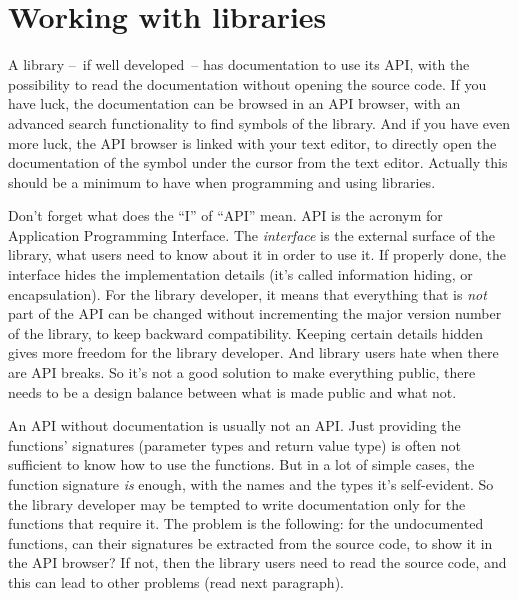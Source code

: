\documentclass[a4paper,11pt]{article}
\date{January 3, 2020}
\title{\documentTitle}
\author{\documentAuthor}
\begin{document}
\maketitle
\tableofcontents

\begin{abstract}
  This article tries to convince application developers to write API documentation. We first look at libraries, and what are the requisite ingredients to make the programmer's life easier (note, not all libraries or development platforms follow all those ingredients, so there is room for improvement in libraries as well). Then we look at applications, why an application usually lacks proper API documentation, and what problems it causes.
\end{abstract}


\section{Working with libraries}

A library --~if well developed~-- has documentation to use its API, with the possibility to read the documentation without opening the source code. If you have luck, the documentation can be browsed in an API browser, with an advanced search functionality to find symbols of the library. And if you have even more luck, the API browser is linked with your text editor, to directly open the documentation of the symbol under the cursor from the text editor. Actually this should be a minimum to have when programming and using libraries.

Don't forget what does the ``I'' of ``API'' mean. API is the acronym for Application Programming Interface. The \emph{interface} is the external surface of the library, what users need to know about it in order to use it. If properly done, the interface hides the implementation details (it's called information hiding, or encapsulation). For the library developer, it means that everything that is \emph{not} part of the API can be changed without incrementing the major version number of the library, to keep backward compatibility. Keeping certain details hidden gives more freedom for the library developer. And library users hate when there are API breaks. So it's not a good solution to make everything public, there needs to be a design balance between what is made public and what not.

An API without documentation is usually not an API. Just providing the functions' signatures (parameter types and return value type) is often not sufficient to know how to use the functions. But in a lot of simple cases, the function signature \emph{is} enough, with the names and the types it's self-evident. So the library developer may be tempted to write documentation only for the functions that require it. The problem is the following: for the undocumented functions, can their signatures be extracted from the source code, to show it in the API browser? If not, then the library users need to read the source code, and this can lead to other problems (read next paragraph).
\end{document}

